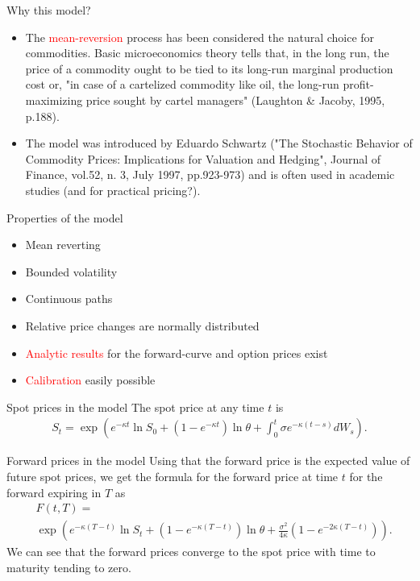 {%
{Why this model?}
\begin{itemize}
\item<1-> The \textcolor{red}{mean-reversion} process has been considered the natural choice for commodities. Basic microeconomics theory tells that, in the long run, the price of a commodity ought to be tied to its long-run marginal production cost or, "in case of a cartelized commodity like oil, the long-run profit-maximizing price sought by cartel managers" (Laughton \& Jacoby, 1995, p.188).
\item<2->  The model was introduced by Eduardo Schwartz ("The Stochastic Behavior of Commodity Prices: Implications for Valuation and Hedging", Journal of Finance, vol.52, n. 3, July 1997, pp.923-973) and is often used in academic studies (and for practical pricing?).
\end{itemize}

{Properties of the model}
\begin{itemize}
\item<1-> Mean reverting
\item<2-> Bounded volatility
\item<3-> Continuous paths
\item<4-> Relative price changes are normally distributed
\item<5-> \textcolor{red}{Analytic results} for the forward-curve and option prices exist
\item<6-> \textcolor{red}{Calibration} easily possible
\end{itemize}


{Spot prices in the model}
The spot price at any time $t$ is
\begin{align*}
	S_t = \exp \left( e^{-\kappa t} \ln S_0 + (1-e^{-\kappa t}) \ln \theta + \int_0^t{\sigma e^{-\kappa (t-s)}}dW_s \right).
\end{align*}

{Forward prices in the model}
Using that the forward price is the expected value of future spot prices,
we get the formula for the forward price at time $t$ for the forward expiring in $T$ as
\begin{align*}
	&F(t,T) = \\
	&\exp \left( e^{-\kappa(T-t)} \ln S_t + (1-e^{-\kappa(T-t)}) \ln \theta + \frac{\sigma^2}{4\kappa}(1-e^{-2\kappa(T-t)}) \right).
\end{align*}
We can see that the forward prices converge to the spot price with time to maturity tending to zero.

}
